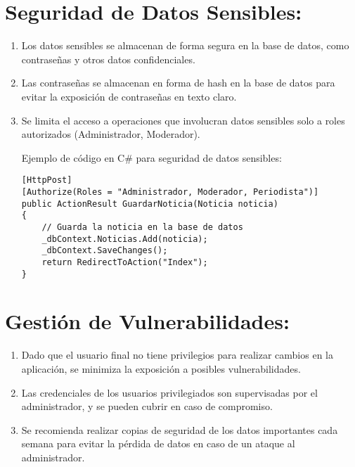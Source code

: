 \documentclass{article}
\begin{document}
\section{Seguridad de Datos Sensibles:}

\begin{enumerate}[label=4.\arabic*]
\item Los datos sensibles se almacenan de forma segura en la base de datos, como contraseñas y otros datos confidenciales.
\item Las contraseñas se almacenan en forma de hash en la base de datos para evitar la exposición de contraseñas en texto claro.
\item Se limita el acceso a operaciones que involucran datos sensibles solo a roles autorizados (Administrador, Moderador).

Ejemplo de código en C# para seguridad de datos sensibles:

\begin{verbatim}
[HttpPost]
[Authorize(Roles = "Administrador, Moderador, Periodista")]
public ActionResult GuardarNoticia(Noticia noticia)
{
    // Guarda la noticia en la base de datos
    _dbContext.Noticias.Add(noticia);
    _dbContext.SaveChanges();
    return RedirectToAction("Index");
}
\end{verbatim}

\end{enumerate}

\section{Gestión de Vulnerabilidades:}

\begin{enumerate}[label=5.\arabic*]
\item Dado que el usuario final no tiene privilegios para realizar cambios en la aplicación, se minimiza la exposición a posibles vulnerabilidades.
\item Las credenciales de los usuarios privilegiados son supervisadas por el administrador, y se pueden cubrir en caso de compromiso.
\item Se recomienda realizar copias de seguridad de los datos importantes cada semana para evitar la pérdida de datos en caso de un ataque al administrador.
\end{enumerate}
\end{document}
